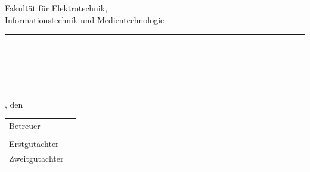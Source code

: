 	\begin{titlepage}
		\sffamily%
		\hspace{-1.5em}%
		\buwandtmdtlogos{1.42cm}%
		\hfill%
		\begin{minipage}[b]{\dimexpr\linewidth-7cm\relax}
			\begin{flushright}
				\normalsize{Fakultät für Elektrotechnik,}%
				\\\vspace{0.2mm}
				\normalsize{Informationstechnik und Medientechnologie}%
				\vspace*{0.05mm}
			\end{flushright}
		\end{minipage}
		\vspace{-0.3em}
		\begingroup%
			\color{primary}%
			\rule{\textwidth}{3pt}%
		\endgroup%
		\begin{flushright}
			\lehrstuhl
		\end{flushright}
		
		\vspace{3.2em}
		\begin{center}
			\textbf{\Huge \artderarbeit}%
			\vspace{1.4em}
			\\
			\textbf{\large{\thema}}%
		\end{center}
		
		
		\vfill
	
	
		\begin{center}
			\Large
			\autor%
			\\
			{\Large\matrikelnummer}%
			\bigskip\\%
			\studiengang%
			\ifstrempty{\schwerpunkt}{}{%
				\\
				{\large\schwerpunkt}%
			}%
			\vspace{2em}%
			\hspace{0em}\\%
			\normalsize%
			\ort, den \abgabedatum%
		\end{center}
		
		
		\vfill
		
		\begin{tabular}{ll}
			Betreuer       & \betreuer \\
			               &           \\
			Erstgutachter  & \prueferA \\
			Zweitgutachter & \prueferB
		\end{tabular}
	\end{titlepage}
